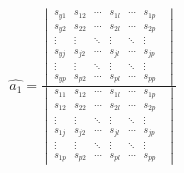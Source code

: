 \documentclass[dvipdfmx]{jsarticle}
\begin{document}
\begin{equation}
  \begin{array}{c}
    \hat{a_1} =
    \frac{
      \begin{vmatrix}
        s_{y1}  &
        s_{12 } &
        \cdots  &
        s_{1l}  &
        \cdots  &
        s_{1p}
        \\
        s_{y2}  &
        s_{22 } &
        \cdots  &
        s_{2l}  &
        \cdots  &
        s_{2p}
        \\
        \vdots  &
        \vdots  &
        \ddots  &
        \vdots  &
        \ddots  &
        \vdots  &
        \\
        s_{yj}  &
        s_{j2}  &
        \cdots  &
        s_{jl}  &
        \cdots  &
        s_{jp}    \\
        \vdots  &
        \vdots  &
        \ddots  &
        \vdots  &
        \ddots  &
        \vdots  &
        \\
        s_{yp}  &
        s_{p2 } &
        \cdots  &
        s_{pl}  &
        \cdots  &
        s_{pp}
      \end{vmatrix}
    }{
      \begin{vmatrix}
        s_{11}  &
        s_{12 } &
        \cdots  &
        s_{1l}  &
        \cdots  &
        s_{1p}
        \\
        s_{12}  &
        s_{22 } &
        \cdots  &
        s_{2l}  &
        \cdots  &
        s_{2p}
        \\
        \vdots  &
        \vdots  &
        \ddots  &
        \vdots  &
        \ddots  &
        \vdots  &
        \\
        s_{1j}  &
        s_{j2}  &
        \cdots  &
        s_{jl}  &
        \cdots  &
        s_{jp}    \\
        \vdots  &
        \vdots  &
        \ddots  &
        \vdots  &
        \ddots  &
        \vdots  &
        \\
        s_{1p}  &
        s_{p2 } &
        \cdots  &
        s_{pl}  &
        \cdots  &
        s_{pp}
      \end{vmatrix}
    }

    \\
    \\


\end{array}
\end{equation}
\end{document}
